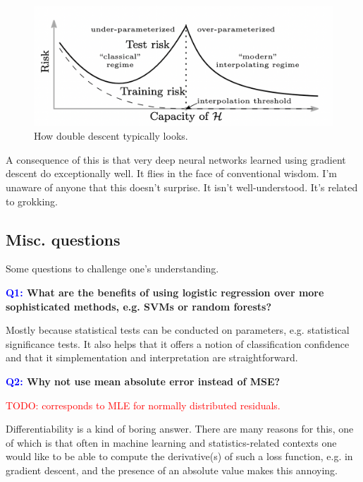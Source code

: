 \documentclass[11pt]{article}
\begin{document}
\begin{figure}[ht]
    \centering
    \includegraphics[width=\columnwidth]{./figures/supervised_learning/double_descent.png}
    \caption{How double descent typically looks.}
    \label{fig:double_descent}
\end{figure}

A consequence of this is that very deep neural networks learned using gradient descent do exceptionally well. It flies in the face of conventional wisdom. I'm unaware of anyone that this doesn't surprise. It isn't well-understood. It's related to grokking.

\subsection{Misc. questions}

Some questions to challenge one's understanding.

\begin{center}
    \textbf{\textcolor{blue}{Q1:} What are the benefits of using logistic regression over more sophisticated methods, e.g. SVMs or random forests?}
\end{center}
Mostly because statistical tests can be conducted on parameters, e.g. statistical significance tests. It also helps that it offers a notion of classification confidence and that it simplementation and interpretation are straightforward.

\begin{center}
    \textbf{\textcolor{blue}{Q2:} Why not use mean absolute error instead of MSE?}
\end{center}
\textcolor{red}{TODO: corresponds to MLE for normally distributed residuals.}

Differentiability is a kind of boring answer. There are many reasons for this, one of which is that often in machine learning and statistics-related contexts one would like to be able to compute the derivative(s) of such a loss function, e.g. in gradient descent, and the presence of an absolute value makes this annoying.
\end{document}
